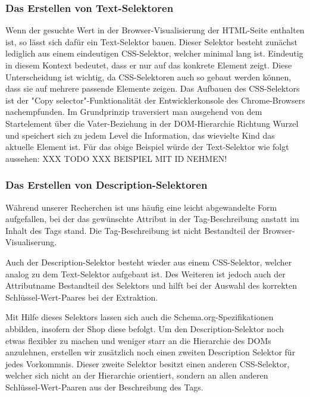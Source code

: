 \subsubsection{Das Erstellen von Text-Selektoren}
\label{subsubsec:erstellen-von-text-selektoren}

Wenn der gesuchte Wert in der Browser-Visualisierung der HTML-Seite enthalten ist, so lässt sich dafür ein
Text-Selektor bauen.
Dieser Selektor besteht zunächst lediglich aus einem eindeutigen CSS-Selektor, welcher minimal lang ist.
Eindeutig in diesem Kontext bedeutet, dass er nur auf das konkrete Element zeigt.
Diese Unterscheidung ist wichtig, da CSS-Selektoren auch so gebaut werden können, dass sie auf mehrere passende
Elemente zeigen.
Das Aufbauen des CSS-Selektors ist der "Copy selector"-Funktionalität der Entwicklerkonsole des Chrome-Browsers
nachempfunden.
Im Grundprinzip traversiert man ausgehend von dem Startelement über die Vater-Beziehung in der
DOM-Hierarchie Richtung Wurzel und speichert sich zu jedem Level die Information, das wievielte Kind das aktuelle
Element ist.
Für das obige Beispiel würde der Text-Selektor wie folgt aussehen: XXX TODO XXX BEISPIEL MIT ID NEHMEN!

\subsubsection{Das Erstellen von Description-Selektoren}
\label{subsubsec:erstellen-von-description-selektoren}

Während unserer Recherchen ist uns häufig eine leicht abgewandelte Form aufgefallen, bei der das gewünschte Attribut
in der Tag-Beschreibung anstatt im Inhalt des Tags stand.
Die Tag-Beschreibung ist nicht Bestandteil der Browser-Visualiserung.

Auch der Description-Selektor besteht wieder aus einem CSS-Selektor, welcher analog zu dem Text-Selektor aufgebaut ist.
Des Weiteren ist jedoch auch der Attributname Bestandteil des Selektors und hilft bei der Auswahl des korrekten
Schlüssel-Wert-Paares bei der Extraktion.

Mit Hilfe dieses Selektors lassen sich auch die Schema.org-Spezifikationen abbilden, insofern der Shop diese befolgt.
Um den Description-Selektor noch etwas flexibler zu machen und weniger starr an die Hierarchie des DOMs anzulehnen,
erstellen wir zusätzlich noch einen zweiten Description Selektor für jedes Vorkommnis.
Dieser zweite Selektor besitzt einen anderen CSS-Selektor, welcher sich nicht an der Hierarchie orientiert, sondern
an allen anderen Schlüssel-Wert-Paaren aus der Beschreibung des Tags.

